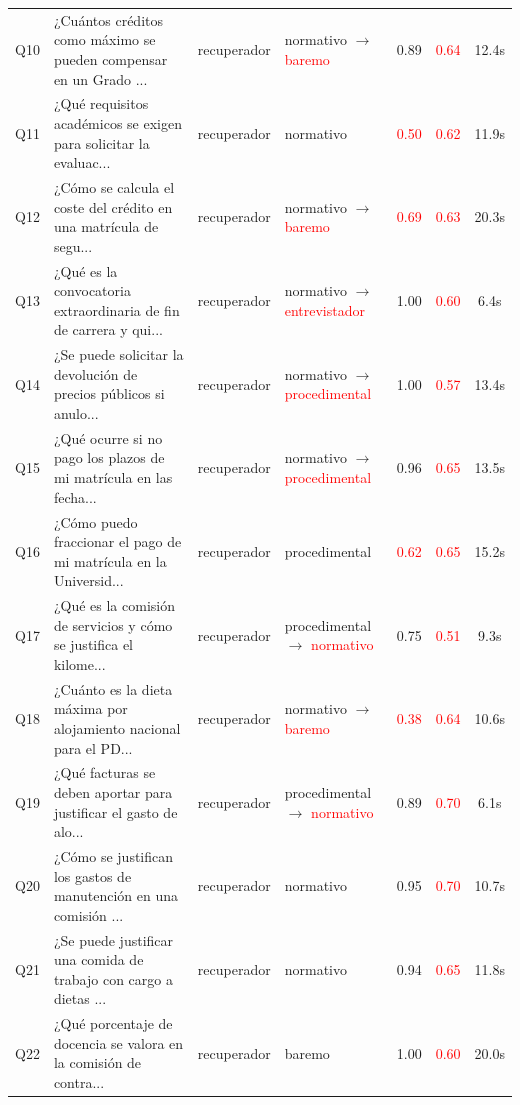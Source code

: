 \documentclass[12pt,a4paper,oneside]{report}
\begin{document}
\begin{longtable}{p{0.6cm} p{5.0cm} p{2.6cm} p{2.6cm} c c c}
Q10 & ¿Cuántos créditos como máximo se pueden compensar en un Grado ... & recuperador & normativo $\rightarrow$ \textcolor{red}{baremo} & 0.89 & \textcolor{red}{0.64} & 12.4s \\
Q11 & ¿Qué requisitos académicos se exigen para solicitar la evaluac... & recuperador & normativo & \textcolor{red}{0.50} & \textcolor{red}{0.62} & 11.9s \\
Q12 & ¿Cómo se calcula el coste del crédito en una matrícula de segu... & recuperador & normativo $\rightarrow$ \textcolor{red}{baremo} & \textcolor{red}{0.69} & \textcolor{red}{0.63} & 20.3s \\
Q13 & ¿Qué es la convocatoria extraordinaria de fin de carrera y qui... & recuperador & normativo $\rightarrow$ \textcolor{red}{entrevistador} & 1.00 & \textcolor{red}{0.60} & 6.4s \\
Q14 & ¿Se puede solicitar la devolución de precios públicos si anulo... & recuperador & normativo $\rightarrow$ \textcolor{red}{procedimental} & 1.00 & \textcolor{red}{0.57} & 13.4s \\
Q15 & ¿Qué ocurre si no pago los plazos de mi matrícula en las fecha... & recuperador & normativo $\rightarrow$ \textcolor{red}{procedimental} & 0.96 & \textcolor{red}{0.65} & 13.5s \\
Q16 & ¿Cómo puedo fraccionar el pago de mi matrícula en la Universid... & recuperador & procedimental & \textcolor{red}{0.62} & \textcolor{red}{0.65} & 15.2s \\
Q17 & ¿Qué es la comisión de servicios y cómo se justifica el kilome... & recuperador & procedimental $\rightarrow$ \textcolor{red}{normativo} & 0.75 & \textcolor{red}{0.51} & 9.3s \\
Q18 & ¿Cuánto es la dieta máxima por alojamiento nacional para el PD... & recuperador & normativo $\rightarrow$ \textcolor{red}{baremo} & \textcolor{red}{0.38} & \textcolor{red}{0.64} & 10.6s \\
Q19 & ¿Qué facturas se deben aportar para justificar el gasto de alo... & recuperador & procedimental $\rightarrow$ \textcolor{red}{normativo} & 0.89 & \textcolor{red}{0.70} & 6.1s \\
Q20 & ¿Cómo se justifican los gastos de manutención en una comisión ... & recuperador & normativo & 0.95 & \textcolor{red}{0.70} & 10.7s \\
Q21 & ¿Se puede justificar una comida de trabajo con cargo a dietas ... & recuperador & normativo & 0.94 & \textcolor{red}{0.65} & 11.8s \\
Q22 & ¿Qué porcentaje de docencia se valora en la comisión de contra... & recuperador & baremo & 1.00 & \textcolor{red}{0.60} & 20.0s \\

\end{longtable}
\end{document}
